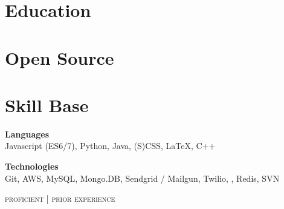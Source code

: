 \documentclass{article}
\begin{document}
\begin{minipage}[t]{0.35\textwidth}
  \vspace{0pt}

  \section{Education}

    

    

  \section{Open Source}

    

    

  \section{Skill Base}
  {\raggedright
    \textbf{Languages} \\
    {\small
      {\color{highlight}
        Javascript (ES6/7), Python, Java, (S)CSS,
      }
      LaTeX, C++
    }

    \vspace{5pt}

    \textbf{Technologies} \\
    {\small
      {\color{highlight}
        Git, AWS, MySQL, Mongo.DB, Sendgrid / Mailgun, Twilio,
      },
      Redis, SVN
    }

    \hfill\textsc{\footnotesize{{\color{highlight} proficient} | prior experience}}
  }
\end{minipage}
\end{document}
